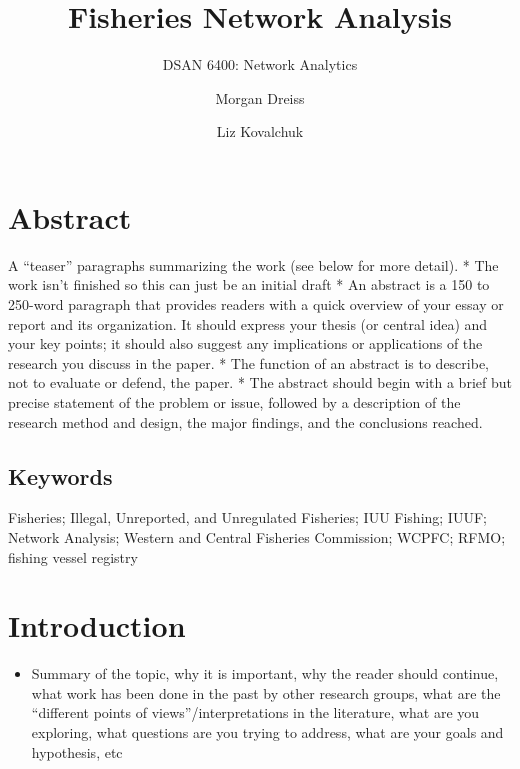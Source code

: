 \documentclass[
  letterpaper,
  DIV=11,
  numbers=noendperiod]{scrartcl}
\title{Fisheries Network Analysis}
\subtitle{DSAN 6400: Network Analytics}
\author{Morgan Dreiss \and Liz Kovalchuk}
\date{}
\providecommand{\tightlist}{%
  \setlength{\itemsep}{0pt}\setlength{\parskip}{0pt}}\usepackage{longtable,booktabs,array}
\renewcommand*\contentsname{Table of contents}
\newcommand\contentsname{Table of contents}
\begin{document}
\maketitle

\renewcommand*\contentsname{Table of contents}
{
\hypersetup{linkcolor=}
\setcounter{tocdepth}{3}
\tableofcontents
}

\section{Abstract}\label{abstract}

A ``teaser'' paragraphs summarizing the work (see below for more
detail). * The work isn't finished so this can just be an initial draft
* An abstract is a 150 to 250-word paragraph that provides readers with
a quick overview of your essay or report and its organization. It should
express your thesis (or central idea) and your key points; it should
also suggest any implications or applications of the research you
discuss in the paper. * The function of an abstract is to describe, not
to evaluate or defend, the paper. * The abstract should begin with a
brief but precise statement of the problem or issue, followed by a
description of the research method and design, the major findings, and
the conclusions reached.

\subsection{Keywords}\label{keywords}

Fisheries; Illegal, Unreported, and Unregulated Fisheries; IUU Fishing;
IUUF; Network Analysis; Western and Central Fisheries Commission; WCPFC;
RFMO; fishing vessel registry

\section{Introduction}\label{introduction}

\begin{itemize}
\tightlist
\item
  Summary of the topic, why it is important, why the reader should
  continue, what work has been done in the past by other research
  groups, what are the ``different points of views''/interpretations in
  the literature, what are you exploring, what questions are you trying
  to address, what are your goals and hypothesis, etc
\end{itemize}
\end{document}

